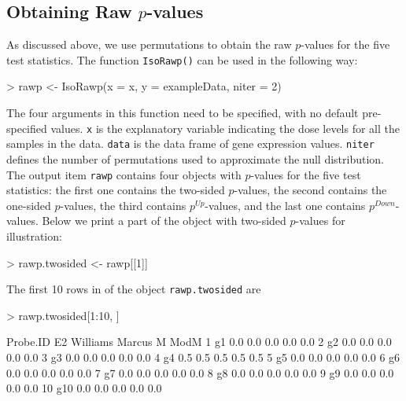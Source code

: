 \documentclass[10pt]{article}
\begin{document}
\subsection{Obtaining Raw $p$-values}

As discussed above, we use permutations to obtain the raw $p$-values
for the five test statistics. The function \texttt{IsoRawp()} can be
used in the following way:

\begin{Schunk}
\begin{Sinput}
> rawp <- IsoRawp(x = x, y = exampleData, niter = 2)
\end{Sinput}
\end{Schunk}


The four arguments in this function need to be specified, with no
default pre-specified values. \texttt{x} is the explanatory variable
indicating the dose levels for all the samples in the data.
\texttt{data} is the data frame of gene expression values. 
\texttt{niter} defines the number of permutations used to
approximate the null distribution. The output item
\texttt{rawp} contains four objects with $p$-values for the five
test statistics: the first one contains the two-sided $p$-values,
the second contains the one-sided $p$-values, the third contains
$p^{Up}$-values, and the last one contains $p^{Down}$-values. Below
we print a part of the object with two-sided $p$-values for illustration:

\begin{Schunk}
\begin{Sinput}
> rawp.twosided <- rawp[[1]]
\end{Sinput}
\end{Schunk}


The first 10 rows in of the object \texttt{rawp.twosided} are
\begin{Schunk}
\begin{Sinput}
> rawp.twosided[1:10, ]
\end{Sinput}
\begin{Soutput}
   Probe.ID  E2 Williams Marcus   M ModM
1        g1 0.0      0.0    0.0 0.0  0.0
2        g2 0.0      0.0    0.0 0.0  0.0
3        g3 0.0      0.0    0.0 0.0  0.0
4        g4 0.5      0.5    0.5 0.5  0.5
5        g5 0.0      0.0    0.0 0.0  0.0
6        g6 0.0      0.0    0.0 0.0  0.0
7        g7 0.0      0.0    0.0 0.0  0.0
8        g8 0.0      0.0    0.0 0.0  0.0
9        g9 0.0      0.0    0.0 0.0  0.0
10      g10 0.0      0.0    0.0 0.0  0.0
\end{Soutput}
\end{Schunk}
\end{document}
